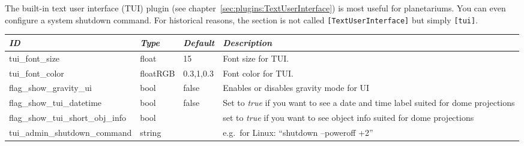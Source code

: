 \section{}\label{sec:config.ini:tui}

The built-in text user interface (TUI) plugin (see chapter~\ref{sec:plugins:TextUserInterface}) is most useful for planetariums. You can even configure a system shutdown command. 
For historical reasons, the section is not called \texttt{[TextUserInterface]} but simply \texttt{[tui]}.

\begin{longtabu} to \textwidth {l|l|l|X}\toprule
\emph{ID} & \emph{Type} &\emph{Default}& \emph{Description}\\\midrule
tui\_font\_size           &float    &15       &Font size for TUI.\\\midrule
tui\_font\_color          &floatRGB &0.3,1,0.3&Font color for TUI.\\\midrule
flag\_show\_gravity\_ui   & bool    &false    & Enables or disables gravity mode for UI\\\midrule
flag\_show\_tui\_datetime & bool    &false    &Set to \emph{true} if you want to see a date and time label suited for dome projections\\\midrule
flag\_show\_tui\_short\_obj\_info   & bool&    &set to \emph{true} if you want to see object info suited for dome projections\\\midrule
tui\_admin\_shutdown\_command       & string  && e.g.\ for Linux: ``shutdown --poweroff +2'' \\\bottomrule
\end{longtabu}

\section{}\label{sec:config.ini:video}

